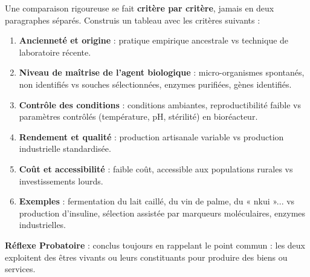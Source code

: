 \documentclass[11pt]{article}
\newcommand{\cle}[1]{{\popxbold\color{popdark}#1}}
\begin{document}
\begin{methode}
Une comparaison rigoureuse se fait \textbf{critère par critère}, jamais en deux paragraphes séparés. Construis un tableau avec les critères suivants :
\begin{enumerate}
\item \textbf{Ancienneté et origine} : pratique empirique ancestrale vs technique de laboratoire récente.
\item \textbf{Niveau de maîtrise de l'agent biologique} : micro-organismes spontanés, non identifiés vs souches sélectionnées, enzymes purifiées, gènes identifiés.
\item \textbf{Contrôle des conditions} : conditions ambiantes, reproductibilité faible vs paramètres contrôlés (température, pH, stérilité) en bioréacteur.
\item \textbf{Rendement et qualité} : production artisanale variable vs production industrielle standardisée.
\item \textbf{Coût et accessibilité} : faible coût, accessible aux populations rurales vs investissements lourds.
\item \textbf{Exemples} : fermentation du lait caillé, du vin de palme, du « nkui »... vs production d'insuline, sélection assistée par marqueurs moléculaires, enzymes industrielles.
\end{enumerate}
\textbf{Réflexe Probatoire} : conclus toujours en rappelant le point commun : les deux exploitent des \cle{êtres vivants ou leurs constituants} pour produire des biens ou services.
\end{methode}
\end{document}
